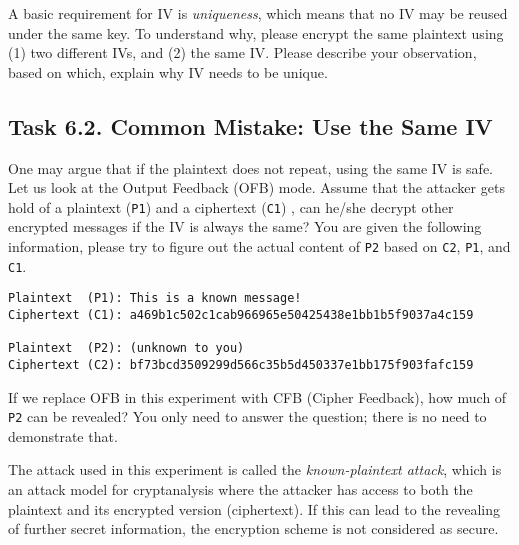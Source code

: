 A basic requirement for IV is \textit{uniqueness},
which means that no IV may be reused under the same key. To understand why,
please encrypt the same plaintext using (1) two different IVs, and (2)
the same IV. Please describe your observation, based on which, explain why
IV needs to be unique.



\subsection{Task 6.2. Common Mistake: Use the Same IV}

One may argue that if the plaintext does not repeat, using
the same IV is safe. Let us look at the Output Feedback (OFB) mode.
Assume that the attacker gets hold of a plaintext (\texttt{P1})
and a ciphertext (\texttt{C1}) ,
can he/she decrypt other encrypted messages if the IV is always the same?
You are given the following information, please try to figure out
the actual content of \texttt{P2} based on \texttt{C2}, \texttt{P1},
and \texttt{C1}.


\begin{lstlisting}
Plaintext  (P1): This is a known message!
Ciphertext (C1): a469b1c502c1cab966965e50425438e1bb1b5f9037a4c159

Plaintext  (P2): (unknown to you)
Ciphertext (C2): bf73bcd3509299d566c35b5d450337e1bb175f903fafc159
\end{lstlisting}

If we replace OFB in this experiment with
CFB (Cipher Feedback), how much of \texttt{P2} can be revealed? You
only need to answer the question; there is no need to demonstrate that.

The attack used in this experiment is called the \textit{known-plaintext
attack}, which is an attack model for cryptanalysis where the
attacker has access to both the plaintext and its
encrypted version (ciphertext). If this can lead to
the revealing of further secret information, the encryption scheme is
not considered as secure.





